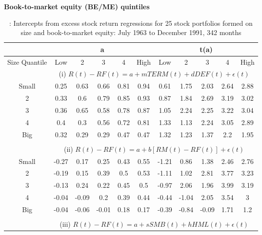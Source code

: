 \documentclass[11pt]{article}
\begin{document}
\begin{table}[H] 
\centering
\caption {: Intercepts from excess stock return regressions for 25 stock portfolios formed on size and book-to-market equity: July 1963 to December 1991, 342 months} \label{tab:table2} 

\textbf{Book-to-market equity (BE/ME) quintiles}\\

\begin{tabular}{ccccccccccc}
\toprule 
 
 \multicolumn{1}{c|}{\textbf{}}  & \multicolumn{5}{c|}{\textbf{a}} & \multicolumn{5}{c|}{\textbf{t(a)}}\\
 \hline
 Size Quantile &    Low  &  2  &  3 & 4 & High &  Low  &  2  &  3 & 4 & High \\ \midrule 
    &  \multicolumn{10}{c}{\small{ (i) $R(t)-RF(t) = a +mTERM(t)+dDEF(t)+\epsilon(t)$}}\\
Small   & 0.25 & 0.63 & 0.66 & 0.81 & 0.94 & 0.61 & 1.75& 2.03& 2.64 & 2.88 \\
2   & 0.33 & 0.6&  0.79& 0.85 &0.93  & 0.87 & 1.84& 2.69 & 3.19 & 3.02 \\
3   & 0.36 & 0.65 & 0.58 & 0.78 & 0.87 & 1.05 & 2.24& 2.25 & 3.22& 3.04 \\
4   & 0.4  & 0.3 & 0.56 & 0.72 & 0.81 & 1.33 & 1.13 & 2.24 & 3.05 & 2.89 \\
Big   & 0.32 & 0.29 & 0.29 & 0.47 & 0.47 & 1.32 & 1.23 & 1.37 & 2.2 & 1.95 \\ \\

    & \multicolumn{10}{c}{\small{(ii) $R(t)-RF(t) = a +b[RM(t)-RF(t)]+\epsilon(t)$}}\\


Small   & -0.27 & 0.17  & 0.25 & 0.43 & 0.55 & -1.21 & 0.86 & 1.38 & 2.46 & 2.76 \\
2   & -0.19 & 0.15 & 0.39& 0.5 & 0.53 & -1.11 & 1.02 & 2.81 & 3.77 & 3.23 \\
3   & -0.13 & 0.24 & 0.22 & 0.45 & 0.5 & -0.97 & 2.06 & 1.96 & 3.99 & 3.19 \\
4   & -0.04 & -0.09 & 0.2 & 0.39 & 0.44 &-0.44 & -1.04 & 2.05 & 3.54 & 3 \\
Big   & -0.04 & -0.06 & -0.01 & 0.18 & 0.17 & -0.39 & -0.84 & -0.09 & 1.71 & 1.2 \\ \\

    &  \multicolumn{10}{c}{\small{(iii) $R(t)-RF(t) = a +sSMB(t)+ hHML(t)+\epsilon(t)$}}\\



\end{tabular}
\end{table}
\end{document}
